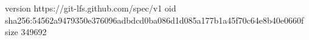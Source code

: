 version https://git-lfs.github.com/spec/v1
oid sha256:54562a9479350e376096adbdcd0ba086d1d085a177b1a45f70c64e8b40e0660f
size 349692
